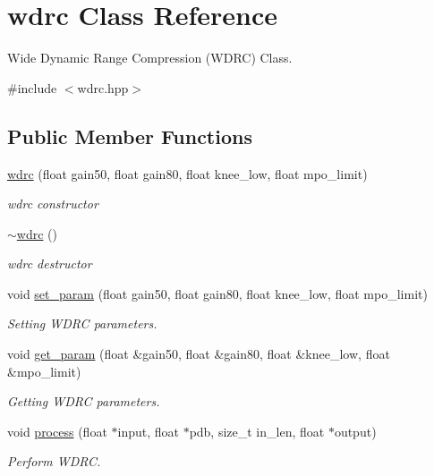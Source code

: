 \hypertarget{classwdrc}{}\section{wdrc Class Reference}
\label{classwdrc}


Wide Dynamic Range Compression (W\+D\+RC) Class.  




{\ttfamily \#include $<$wdrc.\+hpp$>$}

\subsection*{Public Member Functions}
\begin{DoxyCompactItemize}
\item 
\hyperlink{classwdrc_a9a836480fcfd49a21f592d15ef94f290}{wdrc} (float gain50, float gain80, float knee\+\_\+low, float mpo\+\_\+limit)
\begin{DoxyCompactList}\small\item\em wdrc constructor \end{DoxyCompactList}\item 
\mbox{\label{classwdrc_ab99f98ae700777e0505ff3460d107a21}} 
\hyperlink{classwdrc_ab99f98ae700777e0505ff3460d107a21}{$\sim$wdrc} ()
\begin{DoxyCompactList}\small\item\em wdrc destructor \end{DoxyCompactList}\item 
void \hyperlink{classwdrc_a8b804984f0b23d2883f5653e42570caf}{set\+\_\+param} (float gain50, float gain80, float knee\+\_\+low, float mpo\+\_\+limit)
\begin{DoxyCompactList}\small\item\em Setting W\+D\+RC parameters. \end{DoxyCompactList}\item 
void \hyperlink{classwdrc_a9365c99f1d0b4a706dd031d4093922cd}{get\+\_\+param} (float \&gain50, float \&gain80, float \&knee\+\_\+low, float \&mpo\+\_\+limit)
\begin{DoxyCompactList}\small\item\em Getting W\+D\+RC parameters. \end{DoxyCompactList}\item 
void \hyperlink{classwdrc_abc022a485b25b994d226053021224e31}{process} (float $\ast$input, float $\ast$pdb, size\+\_\+t in\+\_\+len, float $\ast$output)
\begin{DoxyCompactList}\small\item\em Perform W\+D\+RC. \end{DoxyCompactList}\end{DoxyCompactItemize}


